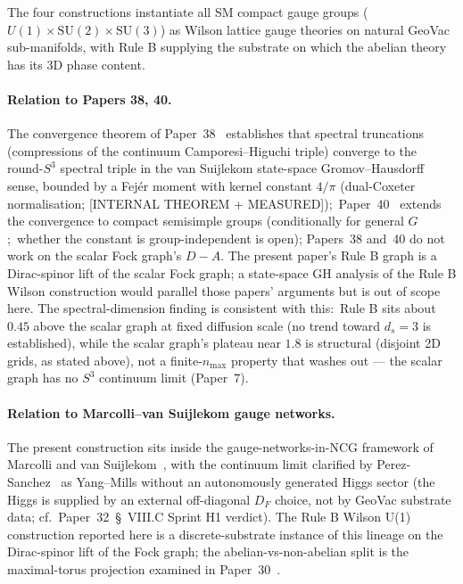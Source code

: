 \documentclass[11pt]{article}
\begin{document}
The four constructions instantiate all SM compact gauge groups
($U(1)\times \mathrm{SU}(2)\times \mathrm{SU}(3)$) as Wilson lattice gauge
theories on natural GeoVac sub-manifolds, with Rule B supplying the
substrate on which the abelian theory has its 3D phase content.

\paragraph{Relation to Papers 38, 40.} The convergence
theorem of Paper~38~\cite{paper38} establishes that
spectral truncations (compressions of the continuum Camporesi--Higuchi triple)
converge to the round-$S^3$ spectral triple in
the van Suijlekom state-space Gromov--Hausdorff sense, bounded by a Fej\'er
moment with kernel constant $4/\pi$ (dual-Coxeter normalisation; [INTERNAL THEOREM +
MEASURED]);\ Paper~40~\cite{paper40}
extends the convergence to compact semisimple groups (conditionally for general $G$;\
whether the constant is group-independent is open);
Papers~38 and~40 do not work on the scalar Fock graph's $D - A$. The
present paper's Rule B graph is a Dirac-spinor lift of the scalar Fock graph;
a state-space GH analysis of the Rule B Wilson
construction would parallel those papers' arguments but is out of scope
here. The spectral-dimension finding is consistent with this:\ Rule B sits
about $0.45$ above the scalar graph at fixed diffusion scale (no trend toward
$d_s=3$ is established), while the scalar graph's plateau near $1.8$ is structural
(disjoint 2D grids, as stated above), not a finite-$n_\text{max}$ property
that washes out --- the scalar graph has no $S^3$ continuum limit (Paper~7).

\paragraph{Relation to Marcolli--van Suijlekom gauge networks.} The
present construction sits inside the gauge-networks-in-NCG framework of
Marcolli and van Suijlekom~\cite{marcolli_vs2014}, with the continuum
limit clarified by Perez-Sanchez~\cite{perez_sanchez2024,
perez_sanchez2025} as Yang--Mills without an autonomously generated
Higgs sector (the Higgs is supplied by an external off-diagonal $D_F$
choice, not by GeoVac substrate data; cf.\ Paper~32~\S~VIII.C Sprint H1
verdict).  The Rule B Wilson U(1) construction reported here is a
discrete-substrate instance of this lineage on the Dirac-spinor lift of
the Fock graph; the abelian-vs-non-abelian split is the maximal-torus
projection examined in Paper~30~\cite{paper30}.
\end{document}
